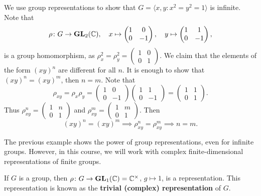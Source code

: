 \begin{example}
	We use group representations to show that 
	$G=\langle x,y:x^2=y^2=1\rangle$ is infinite. Note that
	\[
	\rho\colon G\to\mathbf{GL}_2(\mathbb{C}),
	\quad
	x\mapsto\begin{pmatrix}
		1&0\\
		0&-1	
	\end{pmatrix},\quad
 	y\mapsto\begin{pmatrix}
		1&1\\
		0&-1	
	\end{pmatrix},
 	\]
 	is a group homomorphism, as 
 	$\rho_x^2=\rho_y^2=\begin{pmatrix}
		1&0\\
		0&1	
	\end{pmatrix}$. We claim that the elements of the form $(xy)^n$ are
	different for all $n$. It is enough to show that   
	$(xy)^n=(xy)^m$, then $n=m$. Note that
	\[
	\rho_{xy}=\rho_x\rho_y=\begin{pmatrix}
		1&0\\
		0&-1	
	\end{pmatrix}
	\begin{pmatrix}
		1&1\\
		0&-1	
	\end{pmatrix}
	=\begin{pmatrix}
		1&1\\
		0&1	
	\end{pmatrix}.
	\]
	Thus $\rho_{xy}^n=\begin{pmatrix}
		1&n\\
		0&1	
	\end{pmatrix}$ and 
	$\rho_{xy}^m=\begin{pmatrix}
		1&m\\
		0&1	
	\end{pmatrix}$. Then 
	\[
	(xy)^n=(xy)^m\implies\rho_{xy}^n=\rho_{xy}^m\implies n=m.
	\] 
\end{example}

The previous example shows the power of group representations, even for infinite groups.   
However, in this course, we will work with complex finite-dimensional 
representations of finite
groups.  

\begin{example}
	If $G$ is a group, then $\rho\colon G\to\mathbf{GL}_1(\mathbb{C})=\mathbb{C}^\times$, $g\mapsto 1$, 
	is a representation. This representation is known as the \textbf{trivial (complex) representation} of $G$. 	
\end{example}

